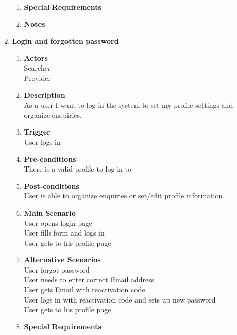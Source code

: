 \documentclass{scrreprt}
\begin{document}
\begin{enumerate}
\begin{enumerate}
		\item \textbf{Special Requirements}

		\item \textbf{Notes}
	\end{enumerate}


	\item \textbf{Login and forgotten password}
	\begin{enumerate}
		\item \textbf{Actors}  \\
			Searcher \\
			Provider \\

		\item \textbf{Description} \\
			As a user I want to log in the system to set my profile settings and organize enquiries. \\
			
		\item \textbf{Trigger} \\
			User logs in\\

		\item \textbf{Pre-conditions} \\
			There is a valid profile to log in to\\

		\item \textbf{Post-conditions} \\
			User is able to organize enquiries or set/edit profile information.\\

		\item \textbf{Main Scenario} \\
			User opens login page \\
			User fills form and logs in \\
			User gets to his profile page \\

		\item \textbf{Alternative Scenarios} \\
			User forgot password\\
			User needs to enter correct Email address\\
			User gets Email with reactivation code\\
			User logs in with reactivation code and sets up new password\\
			User gets to his profile page\\
		\item \textbf{Special Requirements} \\


\end{enumerate}
\end{enumerate}
\end{document}
